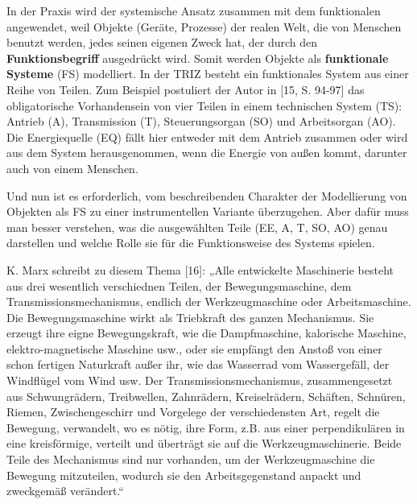 \documentclass[11pt,a4paper]{article}
\begin{document}
In der Praxis wird der systemische Ansatz zusammen mit dem funktionalen
angewendet, weil Objekte (Geräte, Prozesse) der realen Welt, die von Menschen
benutzt werden, jedes seinen eigenen Zweck hat, der durch den
\textbf{Funktionsbegriff} ausgedrückt wird.  Somit werden Objekte als
\textbf{funktionale Systeme} (FS) modelliert.  In der TRIZ besteht ein
funktionales System aus einer Reihe von Teilen.  Zum Beispiel postuliert der
Autor in [15, S. 94-97] das obligatorische Vorhandensein von vier Teilen in
einem technischen System (TS): Antrieb (A), Transmission (T), Steuerungsorgan
(SO) und Arbeitsorgan (AO). Die Energiequelle (EQ) fällt hier entweder mit dem
Antrieb zusammen oder wird aus dem System herausgenommen, wenn die Energie von
außen kommt, darunter auch von einem Menschen.

Und nun ist es erforderlich, vom beschreibenden Charakter der Modellierung von
Objekten als FS zu einer instrumentellen Variante überzugehen. Aber dafür muss
man besser verstehen, was die ausgewählten Teile (EE, A, T, SO, AO) genau
darstellen und welche Rolle sie für die Funktionsweise des Systems spielen.

K. Marx schreibt zu diesem Thema [16]: „Alle entwickelte Maschinerie besteht
aus drei wesentlich verschiednen Teilen, der Bewegungsmaschine, dem
Transmissionsmechanismus, endlich der Werkzeugmaschine oder Arbeitsmaschine.
Die Bewegungsmaschine wirkt als Triebkraft des ganzen Mechanismus. Sie erzeugt
ihre eigne Bewegungskraft, wie die Dampfmaschine, kalorische Maschine,
elektro-magnetische Maschine usw., oder sie empfängt den Anstoß von einer
schon fertigen Naturkraft außer ihr, wie das Wasserrad vom Wassergefäll, der
Windflügel vom Wind usw. Der Transmissionsmechanismus, zusammengesetzt aus
Schwungrädern, Treibwellen, Zahnrädern, Kreiselrädern, Schäften, Schnüren,
Riemen, Zwischengeschirr und Vorgelege der verschiedensten Art, regelt die
Bewegung, verwandelt, wo es nötig, ihre Form, z.B. aus einer perpendikulären
in eine kreisförmige, verteilt und überträgt sie auf die Werkzeugmaschinerie.
Beide Teile des Mechanismus sind nur vorhanden, um der Werkzeugmaschine die
Bewegung mitzuteilen, wodurch sie den Arbeitsgegenstand anpackt und zweckgemäß
verändert.“
\end{document}

